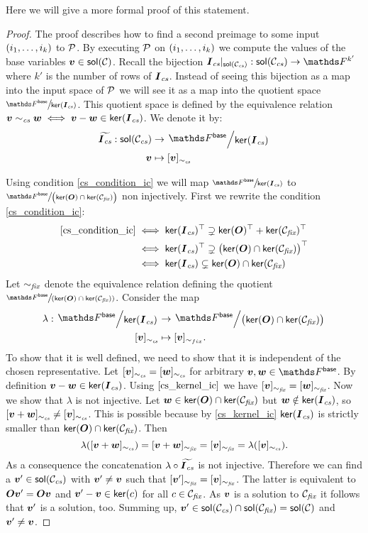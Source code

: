 Here we will give a more formal proof of this statement.
\begin{proof}
    The proof describes how to find a second preimage to some input $(\dts i k)$ to $\P$.
    By executing $\P$ on $(\dts i k)$ we compute the values of the base variables $\vv \in \sol(\C)$.
    Recall the bijection $\Ics|_{\sol(\Ccs)}: \sol(\Ccs) \to \F^{k'}$ where $k'$ is the number of rows of $\Ics$. 
    Instead of seeing this bijection as a map into the input space of $\P$ we will see it as a map into the quotient space
    $\sfrac{\Fsp}{\ker(\Ics)}$.
    This quotient space is defined by the equivalence relation $\vv \; \simcs \; \vw \iff \vv - \vw \in \ker(\Ics)$.
    We denote it by:
    \begin{align*}
    \widetilde\Ics: \sol(\Ccs) &\to \bigslant{\Fsp}{\ker(\Ics)} \\
    \vv &\mapsto [\vv]_\simcs
    \end{align*}
    
    Using condition \eqref{cs_condition_ic} we will map
    $\sfrac{\Fsp}{\ker(\Ics)}$ to $\sfrac{\Fsp}{\big(\ker(\O) \cap \ker(\Cfix)\big)}$
    non injectively.
    First we rewrite the condition \eqref{cs_condition_ic}:
    \begin{align}
    \eqref{cs_condition_ic} &\iff \ker(\Ics)^\top \supsetneq \ker(\O)^\top + \ker(\Cfix)^\top \\
    &\iff \ker(\Ics)^\top \supsetneq \big(\ker(\O) \cap \ker(\Cfix)\big)^\top \\
    \label{cs_kernel_ic}
    &\iff \ker(\Ics) \subsetneq \ker(\O) \cap \ker(\Cfix)
    \end{align}
    Let $\simfix$ denote the equivalence relation defining the quotient $\sfrac{\Fsp}{(\ker(\O) \cap \ker(\Cfix))}$.
    Consider the map
    \begin{align*}
        \lambda: \bigslant{\Fsp}{\ker(\Ics)} &\to \bigslant{\Fsp}{\big(\ker(\O) \cap \ker(\Cfix)\big)} \\
        [\vv]_{\simcs} &\mapsto [\vv]_{\sim_{fix}}.
    \end{align*}
    To show that it is well defined,
    we need to show that it is independent of the chosen representative.
    Let $[\vv]_\simcs = [\vw]_\simcs$ for arbitrary $\vv,\vw \in \Fsp$.
    By definition $\vv-\vw \in \ker(\Ics)$.
    Using $\eqref{cs_kernel_ic}$ we have $[\vv]_\simfix = [\vw]_\simfix$.
    Now we show that $\lambda$ is not injective.
    Let $\vw \in \ker(\O) \cap \ker(\Cfix)$ but $\vw \notin \ker(\Ics)$,
    so $[\vv + \vw]_\simcs \neq [\vv]_\simcs$.
    This is possible because by \eqref{cs_kernel_ic} $\ker(\Ics)$ is strictly smaller than $\ker(\O) \cap \ker(\Cfix)$.
    Then
    \[
        \lambda([\vv + \vw]_\simcs) = [\vv + \vw]_\simfix = [\vv]_\simfix = \lambda([\vv]_\simcs).
    \]
    As a consequence the concatenation $\lambda \circ \widetilde\Ics$ is not injective.
    Therefore we can find a $\vv' \in \sol(\Ccs)$ with $\vv' \neq \vv$ such that $[\vv']_\simfix = [\vv]_\simfix$.
    The latter is equivalent to $\O\vv' = \O\vv$ and $\vv' - \vv \in \ker(c)$ for all $c \in \Cfix$.
    As $\vv$ is a solution to $\Cfix$ it follows that $\vv'$ is a solution, too.
    Summing up, $\vv' \in \sol(\Ccs) \cap \sol(\Cfix) = \sol(\C)$ and $\vv' \neq \vv$.
    

\end{proof}
